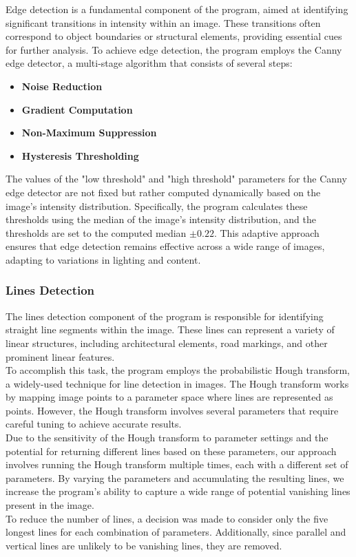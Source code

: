 Edge detection is a fundamental component of the program, aimed at identifying significant transitions in intensity within an image.
These transitions often correspond to object boundaries or structural elements, providing essential cues for further analysis.
To achieve edge detection, the program employs the Canny edge detector, a multi-stage algorithm that consists of several steps:

\begin{itemize}
    \item \textbf{Noise Reduction}
    \item \textbf{Gradient Computation}
    \item \textbf{Non-Maximum Suppression}
    \item \textbf{Hysteresis Thresholding}
\end{itemize}
\noindent
The values of the "low threshold" and "high threshold" parameters for the Canny edge detector are not fixed
but rather computed dynamically based on the image's intensity distribution.
Specifically, the program calculates these thresholds using the median of the image's intensity distribution,
and the thresholds are set to the computed median $\pm 0.22$.
This adaptive approach ensures that edge detection remains effective across a wide range of images, adapting to variations in lighting and content.
\subsubsection*{Lines Detection}
\label{subsubsec:lines-detection}

The lines detection component of the program is responsible for identifying straight line segments within the image.
These lines can represent a variety of linear structures, including architectural elements, road markings, and other prominent linear features.\\
To accomplish this task, the program employs the probabilistic Hough transform, a widely-used technique for line detection in images.
The Hough transform works by mapping image points to a parameter space where lines are represented as points.
However, the Hough transform involves several parameters that require careful tuning to achieve accurate results.\\
Due to the sensitivity of the Hough transform to parameter settings and the potential for returning different lines based on these parameters,
our approach involves running the Hough transform multiple times, each with a different set of parameters.
By varying the parameters and accumulating the resulting lines, we increase the program's ability to capture a wide range of potential vanishing lines
present in the image.\\
To reduce the number of lines, a decision was made to consider only the five longest lines for each combination of parameters.
Additionally, since parallel and vertical lines are unlikely to be vanishing lines, they are removed.


